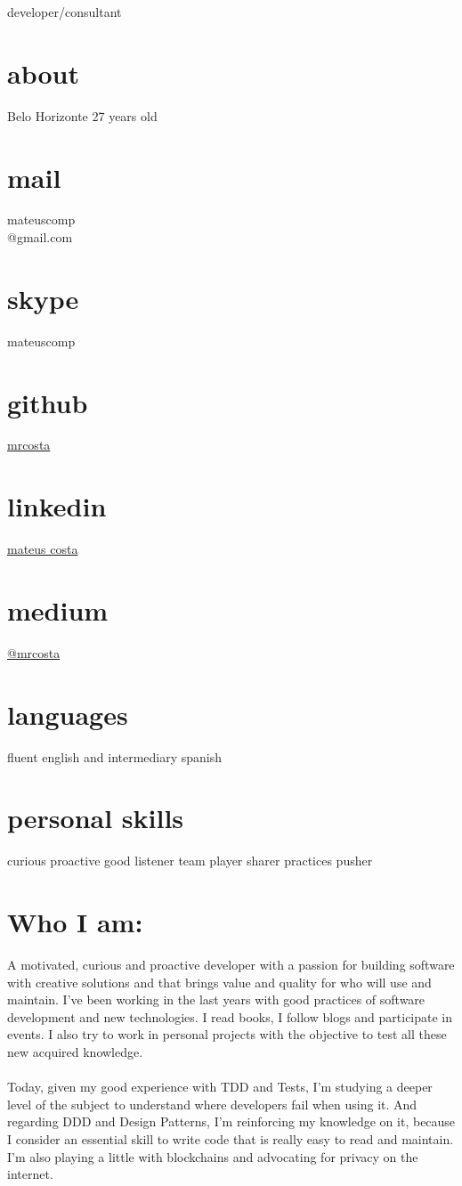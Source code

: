 \documentclass[]{friggeri-cv}
\begin{document}
       {developer/consultant}

\begin{aside}
  \section{about}
    Belo Horizonte
    27 years old
  \section{mail}
    mateuscomp\\@gmail.com 
  \section{skype}
    mateuscomp
  \section{github}
    \href{https://github.com/mrcosta}{mrcosta}
  \section{linkedin}
    \href{www.linkedin.com/in/mateusrodriguescosta}{mateus costa}
  \section{medium}
    \href{https://medium.com/@mrcosta}{@mrcosta}
  \section{languages}
    fluent english and intermediary spanish
  \section{personal skills}
  curious
  proactive
  good listener
  team player
  sharer
  practices pusher
\end{aside}

\section{Who I am:}

A motivated, curious and proactive developer with a passion for building software with creative solutions and that brings value and quality for who will use and maintain. I've been working in the last years with good practices of software development and new technologies. I read books, I follow blogs and participate in events. I also try to work in personal projects with the objective to test all these new acquired knowledge.
    \\\\Today, given my good experience with TDD and Tests, I'm studying a deeper level of the subject to understand where developers fail when using it. And regarding DDD and Design Patterns, I'm reinforcing my knowledge on it, because I consider an essential skill to write code that is really easy to read and maintain. I'm also playing a little with blockchains and advocating for privacy on the internet.
\end{document}

